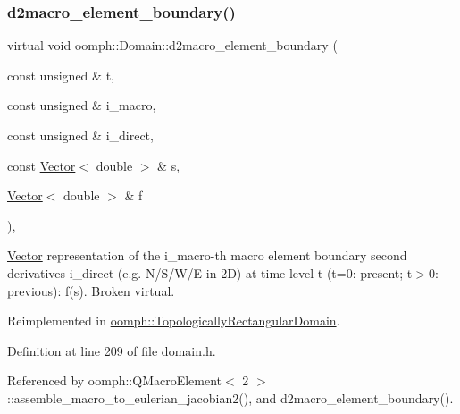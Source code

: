 \subsubsection{\texorpdfstring{d2macro\+\_\+element\+\_\+boundary()}{d2macro\_element\_boundary()}\hspace{0.1cm}{\footnotesize\ttfamily [1/2]}}
{\footnotesize\ttfamily virtual void oomph\+::\+Domain\+::d2macro\+\_\+element\+\_\+boundary (\begin{DoxyParamCaption}\item[{const unsigned \&}]{t,  }\item[{const unsigned \&}]{i\+\_\+macro,  }\item[{const unsigned \&}]{i\+\_\+direct,  }\item[{const \hyperlink{classoomph_1_1Vector}{Vector}$<$ double $>$ \&}]{s,  }\item[{\hyperlink{classoomph_1_1Vector}{Vector}$<$ double $>$ \&}]{f }\end{DoxyParamCaption})\hspace{0.3cm}{\ttfamily [inline]}, {\ttfamily [virtual]}}



\hyperlink{classoomph_1_1Vector}{Vector} representation of the i\+\_\+macro-\/th macro element boundary second derivatives i\+\_\+direct (e.\+g. N/\+S/\+W/E in 2D) at time level t (t=0\+: present; t$>$0\+: previous)\+: f(s). Broken virtual. 



Reimplemented in \hyperlink{classoomph_1_1TopologicallyRectangularDomain_a0b882a9e660cab447c6be8cbeb8c9c18}{oomph\+::\+Topologically\+Rectangular\+Domain}.



Definition at line 209 of file domain.\+h.



Referenced by oomph\+::\+Q\+Macro\+Element$<$ 2 $>$\+::assemble\+\_\+macro\+\_\+to\+\_\+eulerian\+\_\+jacobian2(), and d2macro\+\_\+element\+\_\+boundary().

\mbox{\label{classoomph_1_1Domain_a837d82e917451ca9adc755aa99ad99a2}} 
